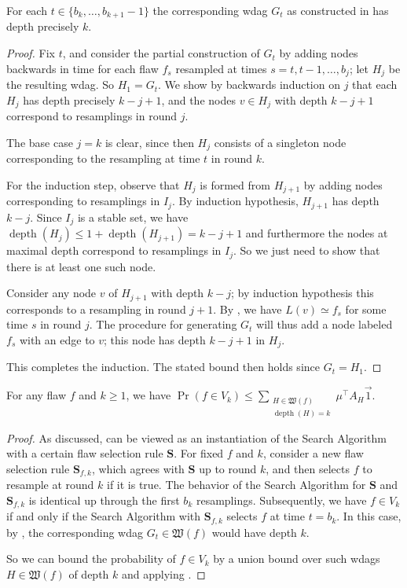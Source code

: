 \documentclass{toc}
\DeclareMathOperator{\depth}{depth}
\begin{document}
\begin{proposition}
\label{gaha1}
For each $t \in \{ b_k, \dots, b_{k+1} - 1 \}$ the corresponding wdag $G_t$ as constructed in  has depth precisely $k$.
\end{proposition}
 \begin{proof}
 Fix $t$, and consider the partial construction of $G_t$ by adding nodes backwards in time for each flaw $f_s$ resampled at times $s = t, t-1, \dots, b_j$; let $H_j$ be the resulting wdag. So $H_1 = G_t$. We show by backwards induction on $j$ that each $H_j$ has depth precisely $k - j + 1$, and the nodes $v \in H_j$ with depth $k - j + 1$ correspond to resamplings in round $j$. 
 
 The base case $j = k$ is clear, since then $H_j$ consists of a singleton node corresponding to the resampling at time $t$ in round $k$.

For the induction step,  observe that $H_j$ is formed from $H_{j+1}$ by adding nodes corresponding to resamplings in $I_j$. By induction hypothesis, $H_{j+1}$ has depth $k-j$. Since $I_j$ is a stable set, we have $\depth(H_{j}) \leq 1 + \depth(H_{j+1}) =  k-j+1$ and furthermore the nodes at maximal depth correspond to resamplings in $I_j$. So we just need to show that there is at least one such node.

Consider any node $v$ of $H_{j+1}$ with depth $k-j$; by induction hypothesis this corresponds to a resampling in round $j+1$. By , we have $L(v) \simeq f_{s}$ for some time $s$ in round $j$. The procedure for generating $G_t$ will thus add a node labeled $f_s$ with an edge to $v$; this node has depth $k-j+1$ in $H_j$. 

This completes the induction.  The stated bound then holds since $G_t = H_1$.
\end{proof}

\begin{proposition}
\label{gaha11}
For any flaw $f$ and $k \geq 1$, we have $\Pr( f \in V_k) \leq \sum_{\substack{H \in \mathfrak W(f) \\ \depth(H) = k}} \mu^{\top} A_H \vec 1$.
\end{proposition}
\begin{proof}
As discussed,  can be viewed as an instantiation of the Search Algorithm with a certain flaw selection rule $\mathbf S$. For fixed $f$ and $k$, consider a new flaw selection rule $\mathbf S_{f,k}$, which agrees with $\mathbf S$ up to round $k$, and then selects $f$ to resample at round $k$ if it is true. The behavior of the Search Algorithm for $\mathbf S$ and $\mathbf S_{f,k}$ is identical up through the first $b_{k}$ resamplings. Subsequently, we have $f \in V_k$ if and only if the Search Algorithm with $\mathbf S_{f,k}$ selects $f$ at time $t = b_{k}$. In this case, by , the corresponding wdag $G_t \in \mathfrak W(f)$ would have depth $k$.

 So we can bound the probability of $f \in V_k$ by a union bound over such wdags $H \in \mathfrak W(f)$ of depth $k$ and applying .
\end{proof}
\end{document}
